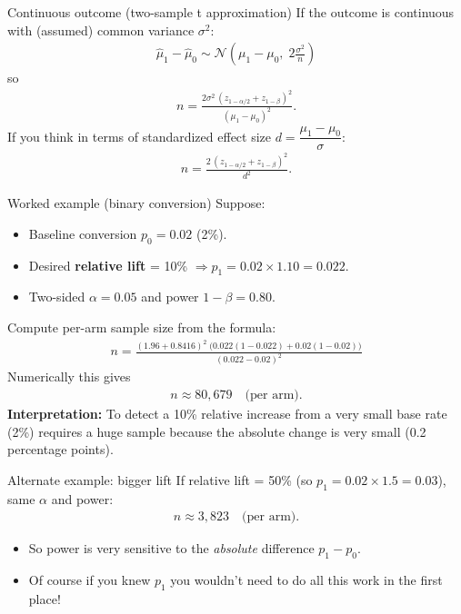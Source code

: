 \documentclass[aspectratio=169,11pt]{beamer}
\begin{document}
\begin{frame}{Continuous outcome (two-sample t approximation)}
  If the outcome is continuous with (assumed) common variance $\sigma^2$:
  \begin{align*}
    \hat{\mu}_1 - \hat{\mu}_0 \sim \mathcal{N}\!\left(\mu_1-\mu_0,\; 2\frac{\sigma^2}{n}\right)
  \end{align*}
  so
  \begin{align*}
    n = \frac{2\sigma^2\,(z_{1-\alpha/2}+z_{1-\beta})^2}{(\mu_1-\mu_0)^2}.
  \end{align*}
  If you think in terms of standardized effect size $d = \dfrac{\mu_1-\mu_0}{\sigma}$:
  \begin{align*}
    n = \frac{2\,(z_{1-\alpha/2}+z_{1-\beta})^2}{d^2}.
  \end{align*}
\end{frame}

\begin{frame}{Worked example (binary conversion)}
  Suppose:
  \begin{itemize}
    \item Baseline conversion $p_0 = 0.02$ (2\%).
    \item Desired \textbf{relative lift} = 10\% $\Rightarrow p_1 = 0.02 \times 1.10 = 0.022$.
    \item Two-sided $\alpha = 0.05$ and power $1-\beta = 0.80$.
  \end{itemize}

  Compute per-arm sample size from the formula:
  \begin{align*}
  n = \frac{(1.96 + 0.8416)^2\;\big(0.022(1-0.022)+0.02(1-0.02)\big)}{(0.022-0.02)^2}
  \end{align*}
  Numerically this gives
  \begin{align*}
    n \approx 80{,}679 \quad\text{(per arm)}.
  \end{align*}
  \vspace{4pt}
  \textbf{Interpretation:} To detect a 10\% relative increase from a very small base rate (2\%) requires a huge sample because the absolute change is very small (0.2 percentage points).
\end{frame}


\begin{frame}{Alternate example: bigger lift}
  If relative lift = 50\% (so $p_1 = 0.02 \times 1.5 = 0.03$), same $\alpha$ and power:
  \begin{align*}
    n \approx 3{,}823 \quad\text{(per arm)}.
  \end{align*}

\begin{itemize}
  \item So power is very sensitive to the \emph{absolute} difference $p_1-p_0$.
  \item Of course if you knew $p_1$ you wouldn't need to do all this work in the first place!
\end{itemize}
\end{frame}
\end{document}
